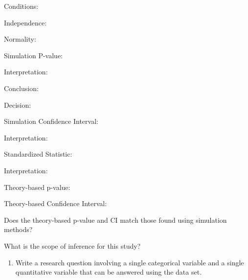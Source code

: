 \documentclass[
]{report}
\providecommand{\tightlist}{%
  \setlength{\itemsep}{0pt}\setlength{\parskip}{0pt}}
\newcommand{\rgi}{\hspace{24pt}}  %
\begin{document}
\vspace{0.3in}

\rgi Conditions:

\rgi \rgi Independence:

\vspace{0.8in}

\rgi \rgi Normality:

\vspace{0.8in}

\rgi Simulation P-value:

\vspace{0.3in}

\rgi \rgi Interpretation:

\vspace{0.8in}

\rgi \rgi Conclusion:

\vspace{0.8in}

\rgi \rgi Decision:

\vspace{0.3in}

\rgi Simulation Confidence Interval:

\vspace{0.3in}

\rgi \rgi Interpretation:

\vspace{0.8in}

\rgi Standardized Statistic:

\vspace{0.3in}

\rgi \rgi Interpretation:

\vspace{0.8in}

\rgi Theory-based p-value:

\vspace{0.3in}

\rgi Theory-based Confidence Interval:

\vspace{0.5in}

\rgi Does the theory-based p-value and CI match those found using simulation methods?

\vspace{0.8in}

\rgi What is the scope of inference for this study?

\vspace{0.8in}

\begin{enumerate}
\def\labelenumi{\arabic{enumi}.}
\setcounter{enumi}{2}
\tightlist
\item
  Write a research question involving a single categorical variable and a single quantitative variable that can be answered using the data set.
\end{enumerate}
\end{document}
